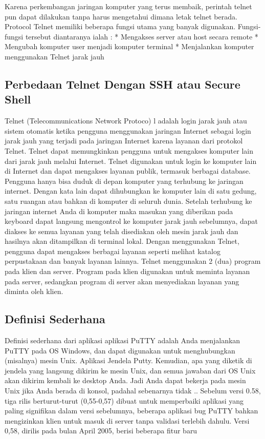Karena perkembangan jaringan komputer yang terus membaik, perintah telnet pun dapat dilakukan tanpa harus mengetahui dimana letak telnet berada. Protocol Telnet memiliki beberapa fungsi utama yang banyak digunakan. Fungsi-fungsi tersebut diantaranya ialah :
* Mengakses server atau host secara remote
* Mengubah komputer user menjadi komputer terminal
* Menjalankan komputer menggunakan Telnet jarak jauh


\subsection {Perbedaan Telnet Dengan SSH atau Secure Shell}

Telnet (Telecommunications Network Protoco) l adalah login jarak jauh atau sistem otomatis ketika pengguna menggunakan jaringan Internet sebagai login jarak jauh yang terjadi pada jaringan Internet karena layanan dari protokol Telnet. Telnet dapat memungkinkan pengguna untuk mengakses komputer lain dari jarak jauh melalui Internet. Telnet digunakan untuk login ke komputer lain di Internet dan dapat mengakses layanan publik, termasuk berbagai database. Pengguna hanya bisa duduk di depan komputer yang terhubung ke jaringan internet. Dengan kata lain dapat dihubungkan ke komputer lain di satu gedung, satu ruangan atau bahkan di komputer di seluruh dunia. Setelah terhubung ke jaringan internet Anda di komputer maka masukan yang diberikan pada keyboard dapat langsung mengontrol ke komputer jarak jauh sebelumnya, dapat diakses ke semua layanan yang telah disediakan oleh mesin jarak jauh dan hasilnya akan ditampilkan di terminal lokal. Dengan menggunakan Telnet, pengguna dapat mengakses berbagai layanan seperti melihat katalog perpustakaan dan banyak layanan lainnya. Telnet menggunakan 2 (dua) program pada klien dan server. Program pada klien digunakan untuk meminta layanan pada server, sedangkan program di server akan menyediakan layanan yang diminta oleh klien.

\subsection { Definisi Sederhana }

Definisi sederhana dari aplikasi aplikasi PuTTY adalah Anda menjalankan PuTTY pada OS Windows, dan dapat digunakan untuk menghubungkan (misalnya) mesin Unix. Aplikasi Jendela Putty. Kemudian, apa yang diketik di jendela yang langsung dikirim ke mesin Unix, dan semua jawaban dari OS Unix akan dikirim kembali ke desktop Anda. Jadi Anda dapat bekerja pada mesin Unix jika Anda berada di konsol, padahal sebenarnya tidak ..
Sebelum versi 0.58, tiga rilis berturut-turut (0,55-0,57) dibuat untuk memperbaiki aplikasi yang paling signifikan dalam versi sebelumnya, beberapa aplikasi bug PuTTY bahkan mengizinkan klien untuk masuk di server tanpa validasi terlebih dahulu. Versi 0,58, dirilis pada bulan April 2005, berisi beberapa fitur baru


